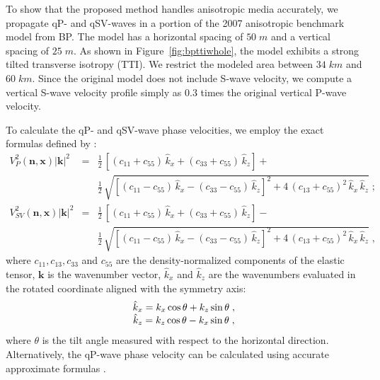 To show that the proposed method handles anisotropic media accurately, we propagate qP- and qSV-waves in a portion of the 2007 anisotropic benchmark model from BP. The model has a horizontal spacing of $50\;m$ and a vertical spacing of $25\;m$. As shown in Figure~\ref{fig:bpttiwhole}, the model exhibits a strong tilted transverse isotropy (TTI). We restrict the modeled area between $34\;km$ and $60\;km$. Since the original model does not include S-wave velocity, we compute a vertical S-wave velocity profile simply as $0.3$ times the original vertical P-wave velocity.

To calculate the qP- and qSV-wave phase velocities, we employ the exact formulas defined by \cite{gassmann64}:
\begin{eqnarray}
  \nonumber
  V^2_{P}(\mathbf{n},\mathbf{x})|\mathbf{k}|^2 & = &
  \frac{1}{2}\,\left[(c_{11}+c_{55})\,\hat{k}_x + (c_{33}+c_{55})\,\hat{k}_z\right] +  \\
  & & \frac{1}{2}\,\sqrt{\left[(c_{11}-c_{55})\,\hat{k}_x - (c_{33}-c_{55})\,\hat{k}_z\right]^2 +
      4\,(c_{13}+c_{55})^2\,\hat{k}_x\,\hat{k}_z}\;; \label{eq:qp} \\
  \nonumber
  V^2_{SV}(\mathbf{n},\mathbf{x})|\mathbf{k}|^2 & = &
  \frac{1}{2}\,\left[(c_{11}+c_{55})\,\hat{k}_x + (c_{33}+c_{55})\,\hat{k}_z\right] -  \\
  & & \frac{1}{2}\,\sqrt{\left[(c_{11}-c_{55})\,\hat{k}_x - 
      (c_{33}-c_{55})\,\hat{k}_z\right]^2 +
      4\,(c_{13}+c_{55})^2\,\hat{k}_x\,\hat{k}_z}\;, \label{eq:qsv}
\end{eqnarray}
where $c_{11},c_{13},c_{33}$ and $c_{55}$ are the density-normalized components of the elastic tensor, $\mathbf{k}$ is the wavenumber vector, $\hat{k}_x$ and $\hat{k}_z$ are the wavenumbers evaluated in the rotated coordinate aligned with the symmetry axis:
\begin{equation}
\label{eq:wavenumber}
\begin{array}{*{20}c}
\hat{k}_x=k_x\cos{\theta}+k_z\sin{\theta}\;,\\ 
\hat{k}_z=k_z\cos{\theta}-k_x\sin{\theta}\;,\\ 
 \end{array}
\end{equation}
where $\theta$ is the tilt angle measured with respect to the horizontal direction. Alternatively, the qP-wave phase velocity can be calculated using accurate approximate formulas \cite[]{tariq98,tariq00,fomel04,sripanich15}.


